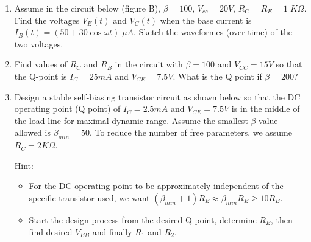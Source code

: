 \begin{enumerate}
\item Assume in the circuit below (figure B), $\beta=100$, $V_{cc}=20V$, 
$R_C=R_E=1\;K\Omega$.  Find the voltages $V_E(t)$ and $V_C(t)$ when 
the base current is $I_B(t)=(50+30 \cos \omega t)\;\mu A$. Sketch the
waveformes (over time) of the two voltages.



\item Find values of $R_C$ and $R_B$ in the circuit with $\beta=100$
and $V_{CC}=15V$ so that the Q-point is $I_C=25mA$ and $V_{CE}=7.5V$.
What is the Q point if $\beta=200$?



%  

\item Design a stable self-biasing transistor circuit as shown below
so that the DC operating point (Q point) of $I_C=2.5mA$ and $V_{CE}=7.5V$ 
is in the middle of the load line for maximal dynamic range. Assume 
the smallest $\beta$ value allowed is $\beta_{min}=50$. To reduce the 
number of free parameters, we assume $R_C=2K\Omega$. 

Hint: 
\begin{itemize}
\item For the DC operating point to be approximately independent of the
  specific transistor used, we want $(\beta_{min}+1)R_E\approx 
  \beta_{min} R_E \ge 10 R_B$.
\item Start the design process from the desired Q-point, determine $R_E$, 
then find desired $V_{BB}$ and finally $R_1$ and $R_2$.
\end{itemize}


\end{enumerate}
